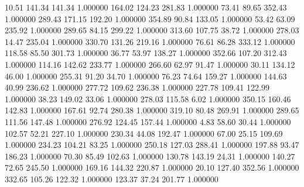      10.51    141.34    141.34  1.000000
    164.02    124.23    281.83  1.000000
     73.41     89.65    352.43  1.000000
    289.43    171.15    192.20  1.000000
    354.89     90.84    133.05  1.000000
     53.42     63.09    235.92  1.000000
    289.65     84.15    299.22  1.000000
    313.60    107.75     38.72  1.000000
    278.03     14.47    235.04  1.000000
    330.70    131.26    219.16  1.000000
     76.61     86.28    333.12  1.000000
    118.58     85.50    301.73  1.000000
     36.77     53.97    138.27  1.000000
    352.66    107.20    312.43  1.000000
    114.16    142.62    233.77  1.000000
    266.60     62.97     91.47  1.000000
     30.11    134.12     46.00  1.000000
    255.31     91.20     34.70  1.000000
     76.23     74.64    159.27  1.000000
    144.63     40.99    236.62  1.000000
    277.72    109.62    236.38  1.000000
    227.78    109.41    122.99  1.000000
     38.23    149.02     33.06  1.000000
    278.03    115.58      6.02  1.000000
    350.15    160.46    142.83  1.000000
    167.61     92.74    280.38  1.000000
    319.10     80.48    269.91  1.000000
    289.65    111.56    147.48  1.000000
    276.92    124.45    157.44  1.000000
      4.83     58.60     30.44  1.000000
    102.57     52.21    227.10  1.000000
    230.34     44.08    192.47  1.000000
     67.00     25.15    109.69  1.000000
    234.23    104.21     83.25  1.000000
    250.18    127.03    288.41  1.000000
    197.88     93.47    186.23  1.000000
     70.30     85.49    102.63  1.000000
    130.78    143.19     24.31  1.000000
    140.27     72.65    245.50  1.000000
    169.16    144.32    220.87  1.000000
     20.10    127.40    352.56  1.000000
    332.65    105.26    122.32  1.000000
    123.37     37.24    201.77  1.000000
